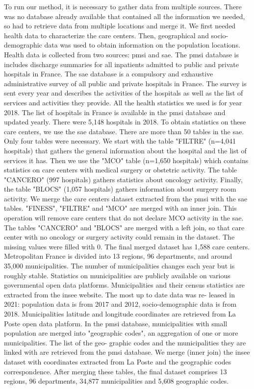 To run our method, it is necessary to gather data from multiple sources. There was no database already available that contained all the information we needed, so had to retrieve data from multiple locations and merge it. We first needed health data to characterize the care centers. Then, geographical and socio-demographic data was used to obtain information on the population locations.
Health data is collected from two sources: \ac{pmsi} and \ac{sae}. The \ac{pmsi} database is includes discharge summaries for all inpatients admitted to public and private hospitals in France. The \ac{sae} database is a compulsory and exhaustive administrative survey of all public and private hospitals in France. The survey is sent every year and describes the activities of the hospitals as well as the list of services and activities they provide. All the health statistics we used is for year 2018.
The list of hospitals in France is available in the \ac{pmsi} database and updated yearly. There were 5,148 hospitals in 2018. To obtain statistics on these care centers, we use the \ac{sae} database. There are more than 50 tables in the \ac{sae}. Only four tables were necessary. We start with the table "FILTRE" (n=4,041 hospitals) that gathers the general information about the hospital and the list of services it has. Then we use the "MCO" table (n=1,650 hospitals) which contains statistics on care centers with medical surgery or obstetric activity. The table "CANCERO" (997 hospitals) gathers statistics about oncology activity. Finally, the table "BLOCS" (1,057 hospitals) gathers information about surgery room activity.
We merge the care centers dataset extracted from the \ac{pmsi} with the \ac{sae} tables. "FINESS", "FILTRE" and "MCO" are merged with an inner join. This operation will remove care centers that do not declare MCO activity in the \ac{sae}. The tables "CANCERO" and "BLOCS" are merged with a left join, so that care center with no oncology or surgery activity could remain in the dataset. The missing values were filled with 0. The final merged dataset has 1,588 care centers.
Metropolitan France is divided into 13 regions, 96 departments, and around 35,000 municipalities. The number of municipalities changes each year but is roughly stable. Statistics on municipalities are publicly available on various governmental open data platforms. Municipalities and their census statistics are extracted from the \ac{insee} website. The most up to date data was re- leased in 2021: population data is from 2017 and 2012, socio-demographic data is from 2018. Municipalities latitude and longitude coordinates are retrieved from La Poste open data platform. In the \ac{pmsi} database, municipalities with small population are merged into "geographic codes", an aggregation of one or more municipalities. The list of the geo- graphic codes and the municipalities they are linked with are retrieved from the \ac{pmsi} database. We merge (inner join) the \ac{insee} dataset with coordinates extracted from La Poste and the geographic codes correspondence. After merging these tables, the final dataset comprises 13 regions, 96 departments, 34,877 municipalities and 5,608 geographic codes.

